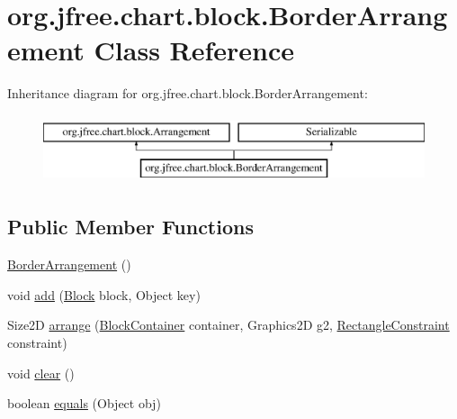 \hypertarget{classorg_1_1jfree_1_1chart_1_1block_1_1_border_arrangement}{}\section{org.\+jfree.\+chart.\+block.\+Border\+Arrangement Class Reference}
\label{classorg_1_1jfree_1_1chart_1_1block_1_1_border_arrangement}
Inheritance diagram for org.\+jfree.\+chart.\+block.\+Border\+Arrangement\+:\begin{figure}[H]
\begin{center}
\leavevmode
\includegraphics[height=2.000000cm]{classorg_1_1jfree_1_1chart_1_1block_1_1_border_arrangement}
\end{center}
\end{figure}
\subsection*{Public Member Functions}
\begin{DoxyCompactItemize}
\item 
\mbox{\hyperlink{classorg_1_1jfree_1_1chart_1_1block_1_1_border_arrangement_ab89272fefc70c03ee8879344625aaabf}{Border\+Arrangement}} ()
\item 
void \mbox{\hyperlink{classorg_1_1jfree_1_1chart_1_1block_1_1_border_arrangement_a37647c2dba63b5085a9005fbbd060d6f}{add}} (\mbox{\hyperlink{interfaceorg_1_1jfree_1_1chart_1_1block_1_1_block}{Block}} block, Object key)
\item 
Size2D \mbox{\hyperlink{classorg_1_1jfree_1_1chart_1_1block_1_1_border_arrangement_a7c05928de6b4ce38e9cbeaaab54dc434}{arrange}} (\mbox{\hyperlink{classorg_1_1jfree_1_1chart_1_1block_1_1_block_container}{Block\+Container}} container, Graphics2D g2, \mbox{\hyperlink{classorg_1_1jfree_1_1chart_1_1block_1_1_rectangle_constraint}{Rectangle\+Constraint}} constraint)
\item 
void \mbox{\hyperlink{classorg_1_1jfree_1_1chart_1_1block_1_1_border_arrangement_a7ac866d41b0692c7f53bb86423fb9973}{clear}} ()
\item 
boolean \mbox{\hyperlink{classorg_1_1jfree_1_1chart_1_1block_1_1_border_arrangement_a3108798bca6c4167c95817f1743932fc}{equals}} (Object obj)
\end{DoxyCompactItemize}
